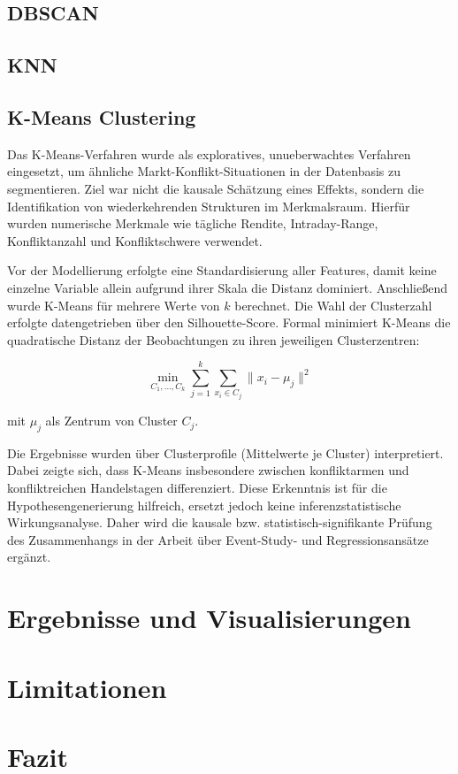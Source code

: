 \documentclass[12pt,a4paper]{article}
\begin{document}
\subsection{DBSCAN}
\subsection{KNN}
\subsection{K-Means Clustering}

Das K-Means-Verfahren wurde als exploratives, unueberwachtes Verfahren eingesetzt,
um ähnliche Markt-Konflikt-Situationen in der Datenbasis zu segmentieren. Ziel war
nicht die kausale Schätzung eines Effekts, sondern die Identifikation von
wiederkehrenden Strukturen im Merkmalsraum. Hierfür wurden numerische Merkmale wie
tägliche Rendite, Intraday-Range, Konfliktanzahl und Konfliktschwere verwendet.

Vor der Modellierung erfolgte eine Standardisierung aller Features, damit keine
einzelne Variable allein aufgrund ihrer Skala die Distanz dominiert. Anschließend
wurde K-Means für mehrere Werte von $k$ berechnet. Die Wahl der Clusterzahl
erfolgte datengetrieben über den Silhouette-Score. Formal minimiert K-Means die
quadratische Distanz der Beobachtungen zu ihren jeweiligen Clusterzentren:

\[
\min_{C_1,\ldots,C_k} \sum_{j=1}^{k} \sum_{x_i \in C_j} \lVert x_i - \mu_j \rVert^2
\]

mit $\mu_j$ als Zentrum von Cluster $C_j$.

Die Ergebnisse wurden über Clusterprofile (Mittelwerte je Cluster) interpretiert.
Dabei zeigte sich, dass K-Means insbesondere zwischen konfliktarmen und
konfliktreichen Handelstagen differenziert. Diese Erkenntnis ist für die
Hypothesengenerierung hilfreich, ersetzt jedoch keine inferenzstatistische
Wirkungsanalyse. Daher wird die kausale bzw. statistisch-signifikante Prüfung des
Zusammenhangs in der Arbeit über Event-Study- und Regressionsansätze ergänzt.

\section{Ergebnisse und Visualisierungen}
\section{Limitationen}
\section{Fazit}
\end{document}
